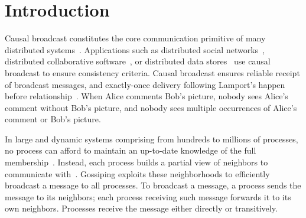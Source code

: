  
\section{Introduction}

Causal broadcast constitutes the core communication primitive of many
distributed systems~\cite{hadzilacos1994modular}. Applications such as
distributed social networks~\cite{borthakur2013petabyte}, distributed
collaborative software~\cite{heinrich2012exploiting,nedelec2016crate}, or
distributed data
stores~\cite{bailis2013bolton,bravo2017saturn,demers1987epidemic,lloyd2011cops,shapiro2011comprehensive}
use causal broadcast to ensure consistency criteria.  Causal broadcast ensures
reliable receipt of broadcast messages, and exactly-once delivery following
Lamport's happen before relationship~\cite{lamport1978time}. When Alice comments
Bob's picture, nobody sees Alice's comment without Bob's picture, and nobody
sees multiple occurrences of Alice's comment or Bob's picture.

In large and dynamic systems comprising from hundreds to millions of processes,
no process can afford to maintain an up-to-date knowledge of the full
membership~\cite{birman1999bimodal,demers1987epidemic}. Instead, each process
builds a partial view of neighbors to communicate
with~\cite{jelasity2007gossip}. Gossiping exploits these neighborhoods to
efficiently broadcast a message to all processes. To broadcast a message, a
process sends the message to its neighbors; each process receiving such message
forwards it to its own neighbors. Processes receive the message either directly
or transitively. 



